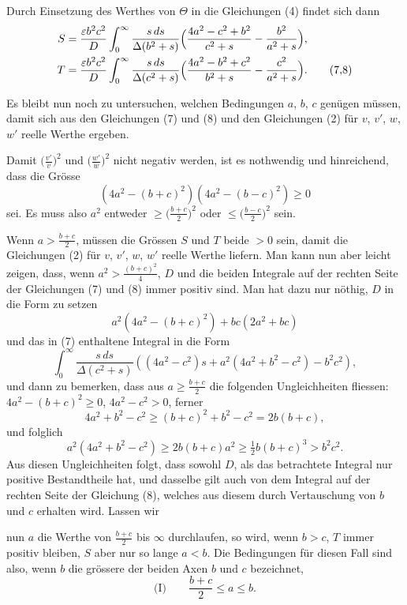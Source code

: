 \documentclass[12pt,a4paper]{article}
\begin{document}
Durch Einsetzung des Werthes von $\Theta$ in die Gleichungen (4) findet sich dann
\begin{align*}
S &= \frac{\varepsilon b^{2}c^{2}}{D}\int_{0}^{\infty}\frac{s\,ds}{\Delta(b^{2} + s)}\Bigl(\frac{4a^{2} - c^{2} + b^{2}}{c^{2} + s} - \frac{b^{2}}{a^{2} + s}\Bigr),\\
T &= \frac{\varepsilon b^{2}c^{2}}{D}\int_{0}^{\infty}\frac{s\,ds}{\Delta(c^{2} + s)}\Bigl(\frac{4a^{2} - b^{2} + c^{2}}{b^{2} + s} - \frac{c^{2}}{a^{2} + s}\Bigr).\tag{7,8}
\end{align*}

Es bleibt nun noch zu untersuchen, welchen Bedingungen $a$, $b$, $c$ gen\"ugen m\"ussen, damit sich aus den Gleichungen (7) und (8) und den Gleichungen (2) f\"ur $v$, $v'$, $w$, $w'$ reelle Werthe ergeben.

Damit $\bigl(\frac{v'}{v}\bigr)^{2}$ und $\bigl(\frac{w'}{w}\bigr)^{2}$ nicht negativ werden, ist es nothwendig und hinreichend, dass die Gr\"osse
\[
(4a^{2} - (b + c)^{2})(4a^{2} - (b - c)^{2}) \geq 0
\]
sei. Es muss also $a^{2}$ entweder $\geq \bigl(\frac{b+c}{2}\bigr)^{2}$ oder $\leq \bigl(\frac{b-c}{2}\bigr)^{2}$ sein.

Wenn $a > \frac{b+c}{2}$, m\"ussen die Gr\"ossen $S$ und $T$ beide $> 0$ sein, damit die Gleichungen (2) f\"ur $v$, $v'$, $w$, $w'$ reelle Werthe liefern. Man kann nun aber leicht zeigen, dass, wenn $a^{2} > \frac{(b+c)^{2}}{4}$, $D$ und die beiden Integrale auf der rechten Seite der Gleichungen (7) und (8) immer positiv sind. Man hat dazu nur n\"othig, $D$ in die Form zu setzen
\[
a^{2}(4a^{2} - (b + c)^{2}) + bc(2a^{2} + bc)
\]
und das in (7) enthaltene Integral in die Form
\[
\int_{0}^{\infty}\frac{s\,ds}{\Delta(c^{2} + s)}((4a^{2} - c^{2})s + a^{2}(4a^{2} + b^{2} - c^{2}) - b^{2}c^{2}),
\]
und dann zu bemerken, dass aus $a \geq \frac{b+c}{2}$ die folgenden Ungleichheiten fliessen: $4a^{2} - (b+c)^{2} \geq 0$, $4a^{2} - c^{2} > 0$, ferner
\[
4a^{2} + b^{2} - c^{2} \geq (b+c)^{2} + b^{2} - c^{2} = 2b(b+c),
\]
und folglich
\[
a^{2}(4a^{2} + b^{2} - c^{2}) \geq 2b(b+c)a^{2} \geq \tfrac{1}{2}b(b+c)^{3} > b^{2}c^{2}.
\]
Aus diesen Ungleichheiten folgt, dass sowohl $D$, als das betrachtete Integral nur positive Bestandtheile hat, und dasselbe gilt auch von dem Integral auf der rechten Seite der Gleichung (8), welches aus diesem durch Vertauschung von $b$ und $c$ erhalten wird. Lassen wir

nun $a$ die Werthe von $\frac{b+c}{2}$ bis $\infty$ durchlaufen, so wird, wenn $b > c$, $T$ immer positiv bleiben, $S$ aber nur so lange $a < b$. Die Bedingungen f\"ur diesen Fall sind also, wenn $b$ die gr\"ossere der beiden Axen $b$ und $c$ bezeichnet,
\[
\text{(I)}\qquad \frac{b+c}{2} \leq a \leq b.
\]
\end{document}
